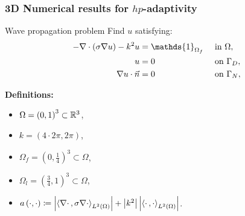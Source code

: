 \begin{frame}
  \frametitle{3D Numerical results for $hp$-adaptivity}
  
  \begin{block}{Wave propagation problem}
     Find \(u\) satisfying:
  \begin{alignat}{2}
    - \nabla \cdot \left( \sigma \nabla u\right) - k^{2}u & = \mathds{1}_{\Omega_{f}} &  & \text{ in } \Omega, \\
    u                                          & =0                        &  & \text{ on } {\Gamma_{D}},                      \\
    \grad u\cdot \vec{n}                       & =0                        &  & \text{ on } {\Gamma_{N}},
  \end{alignat}
  \end{block}

    \textbf{Definitions:}
    \begin{itemize}
      \item \(\Omega = \left(0,1\right)^{3} \subset \mathbb{R}^{3}\),
      \item \(k = \left(4 \cdot 2 \pi, 2 \pi\right)\), 
      \item \( \Omega_{f} = \left(0,\frac{1}{4}\right)^{3} \subset \Omega \),
      \item \(\Omega_{l} = \left(\frac{3}{4},1\right)^{3} \subset \Omega\),
      \item \( a\left(\cdot ,\cdot\right) \coloneqq  \left|\left<\nabla \cdot\,,\sigma \nabla \cdot\right>_{L^{2}\left(\Omega\right)}\right| + \left|k^{2}\right| \left|\left<\cdot\,,\cdot\right>_{L^{2}\left(\Omega\right)}\right| \).
    \end{itemize}

\end{frame}

